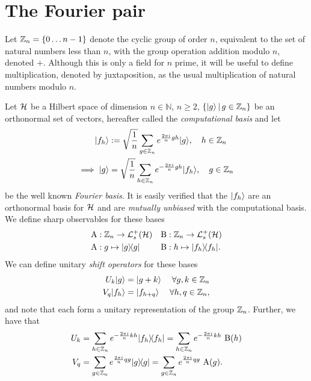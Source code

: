 \section{The Fourier pair}
\label{sec:fourier-pair}
Let $\cyc[n] = \{0\hdots n-1\}$ denote the cyclic group of order $n$, equivalent to the set of natural numbers less than $n$, with the group operation addition modulo $n$, denoted $+$. Although this is only a field for $n$ prime, it will be useful to define multiplication, denoted by juxtaposition, as the usual multiplication of natural numbers modulo $n$. 

Let $\mathcal{H}$ be a Hilbert space of dimension $n\in\mathbb{N}$, $n \geq 2$, $\sbuild{\ket{g}}{g \in \cyc[n]}$ be an orthonormal set of vectors, hereafter called the \emph{computational basis} and let
\begin{align}
  \ket{f_h} &\defeq \sqrt{\frac{1}{n}}\sum_{g\in \cyc[n]} e^{\frac{2\pi i}{n} gh}\ket{g}, \quad h\in\cyc[n]\\
  \implies \ket{g} &= \sqrt{\frac{1}{n}}\sum_{h\in \cyc[n]} e^{-\frac{2\pi i}{n} gh} \ket{f_h}, \quad g\in\cyc[n]
\end{align}
be the well known \emph{Fourier basis}. It is easily verified that the $| f_h \rangle$ are an orthonormal basis for $\mathcal{H}$ and are \emph{mutually unbiased} with the computational basis. We define sharp observables for these bases
\begin{align}
  \opa&:\cyc[n] \to \posops[\hcal] & \opb&:\cyc[n] \to \posops[\hcal]\\
  \opa&:g\mapsto \ketbra{g}{g} & \opb&:h\mapsto \ketbra{f_h}{f_h}.
\end{align}
We can define unitary \emph{shift operators} for these bases
\begin{align}
  U_k \ket{g} &= \ket{g + k} & \forall g,k\in\cyc[n]\\
  V_q \ket{f_h} &= \ket{f_{h+q}}&\forall h,q\in\cyc[n],
\end{align}
and note that each form a unitary representation of the group $\cyc[n]$. Further, we have that
\begin{align}
  U_k &= \sum_{h\in\cyc[n]}e^{-\frac{2\pi i}{n} k h}\ketbra{f_h}{f_h} = \sum_{h\in\cyc[n]}e^{-\frac{2\pi i}{n} k h}\,\opb(h)\\
  V_q &= \sum_{g\in\cyc[n]}e^{\frac{2\pi i}{n} q g}\ketbra{g}{g} = \sum_{g\in\cyc[n]}e^{\frac{2\pi i}{n} q g}\,\opa(g).
\end{align}
